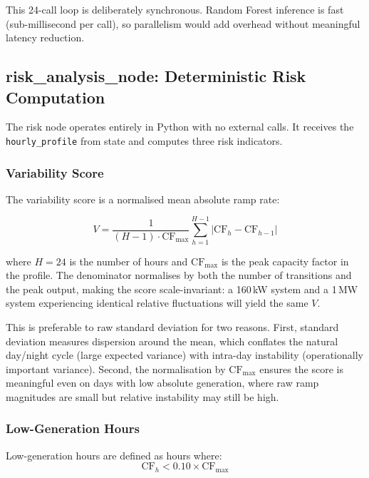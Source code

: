 \documentclass[12pt, a4paper]{article}
\begin{document}
This 24-call loop is deliberately synchronous. Random Forest inference is fast (sub-millisecond per call), so parallelism would add overhead without meaningful latency reduction.

\subsection{risk\_analysis\_node: Deterministic Risk Computation}

The risk node operates entirely in Python with no external calls. It receives the \texttt{hourly\_profile} from state and computes three risk indicators.

\subsubsection{Variability Score}

The variability score is a normalised mean absolute ramp rate:

\begin{equation}
    V = \frac{1}{(H-1) \cdot \text{CF}_{\max}} \sum_{h=1}^{H-1} \left| \text{CF}_h - \text{CF}_{h-1} \right|
\label{eq:variability}
\end{equation}

where $H = 24$ is the number of hours and $\text{CF}_{\max}$ is the peak capacity factor in the profile. The denominator normalises by both the number of transitions and the peak output, making the score scale-invariant: a 160\,kW system and a 1\,MW system experiencing identical relative fluctuations will yield the same $V$.

This is preferable to raw standard deviation for two reasons. First, standard deviation measures dispersion around the mean, which conflates the natural day/night cycle (large expected variance) with intra-day instability (operationally important variance). Second, the normalisation by $\text{CF}_{\max}$ ensures the score is meaningful even on days with low absolute generation, where raw ramp magnitudes are small but relative instability may still be high.

\subsubsection{Low-Generation Hours}

Low-generation hours are defined as hours where:
\begin{equation}
    \text{CF}_h < 0.10 \times \text{CF}_{\max}
\end{equation}
\end{document}
